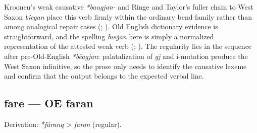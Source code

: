 \documentclass[
  british,
  a4paper,
]{article}
\begin{document}
Kroonen's weak causative \emph{*baugjan-} and Ringe and Taylor's fuller
chain to West Saxon \emph{biegan} place this verb firmly within the
ordinary bend-family rather than among analogical repair cases
(;
). Old English
dictionary evidence is straightforward, and the spelling \emph{bīeġan}
here is simply a normalized representation of the attested weak verb
(;
). The
regularity lies in the sequence after pre-Old-English \emph{*bēagjan}:
palatalization of \emph{gj} and i-mutation produce the West Saxon
infinitive, so the prose only needs to identify the causative lexeme and
confirm that the output belongs to the expected verbal line.

\subsection{fare --- OE faran}\label{fare-oe-faran}

Derivation: \emph{*fáraną} \textgreater{} \emph{faran} (regular).

\begingroup
\setlength{\fboxsep}{6pt}
\end{document}
